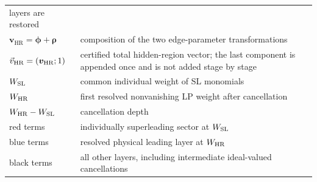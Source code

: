 \documentclass[a4paper,11pt]{article}
\newcommand{\HR}{\mathrm{HR}}
\newcommand{\WSL}{W_{\rm SL}}
\newcommand{\WHR}{W_{\rm HR}}
\newcommand{\vHR}{\vec v_{\rm HR}}
\newcommand{\SLcolour}[1]{{\color{red}#1}}
\newcommand{\HRcolour}[1]{{\color{blue}#1}}
\newcommand{\Othercolour}[1]{{\color{black}#1}}
\begin{document}
\begin{center}
\begin{tabular}{@{}p{}p{}@{}}
  layers are restored\\
\(\boldsymbol v_{\HR}=\boldsymbol\phi+\boldsymbol\rho\) & composition of the
  two edge-parameter transformations\\
\(\vHR=(\boldsymbol v_{\HR};1)\) & certified total hidden-region vector; the
  last component is appended once and is not added stage by stage\\
\(\WSL\) & common individual weight of SL monomials\\
\(\WHR\) & first resolved nonvanishing LP weight after cancellation\\
\(\WHR-\WSL\) & cancellation depth\\
\SLcolour{red terms} & individually superleading sector at \(\WSL\)\\
\HRcolour{blue terms} & resolved physical leading layer at \(\WHR\)\\
\Othercolour{black terms} & all other layers, including intermediate
  ideal-valued cancellations\\
\bottomrule
\end{tabular}
\end{center}
\end{document}
